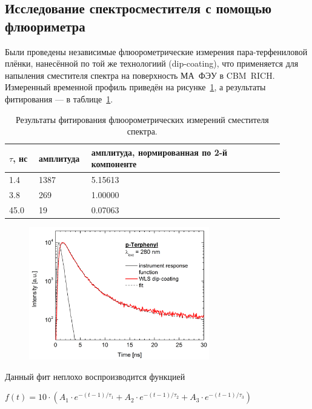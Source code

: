 \subsection{Исследование спектросместителя с помощью флюориметра}


Были проведены независимые флюорометрические измерения пара-тер\-фениловой плёнки, нанесённой по той же технологиий (dip-coating), что применяется для напыления сместителя спектра на поверхность МА~ФЭУ в CBM~RICH. Измеренный временной профиль приведён на рисунке~\ref{fig:MichaelProfile}, а результаты фитирования --- в таблице~\ref{tabl:MichaelValues}.

\begin{table}[H]
\caption{Результаты фитирования флюорометрических измерений сместителя спектра.}
\label{tabl:MichaelValues}
\begin{tabular}{ | p{0.1\linewidth} | p{0.15\linewidth} | p{0.65\linewidth} | }
	\hline
		$ \tau $, нс & амплитуда & амплитуда, нормированная по 2-й компоненте \\
	\hline
		1.4 & 1387 & 5.15613 \\
	\hline
		3.8 & 269 & 1.00000 \\
	\hline
		45.0 & 19 & 0.07063 \\
	\hline
\end{tabular}
\end{table}

\begin{figure}[H]
\includegraphics[width=0.7\textwidth]{pictures/Tau_fluoro_WLS_JLU.png}
\caption{}
\label{fig:MichaelProfile}
\end{figure}

Данный фит неплохо воспроизводится функцией

{\centering
$ f(t) = 10 \cdot ( A_{1} \cdot e^{-(t-1) / \tau_{1}} + A_{2} \cdot e^{-(t-1) / \tau_{2}} + A_{3} \cdot e^{-(t-1) / \tau_{3}} ) $ \\
}

